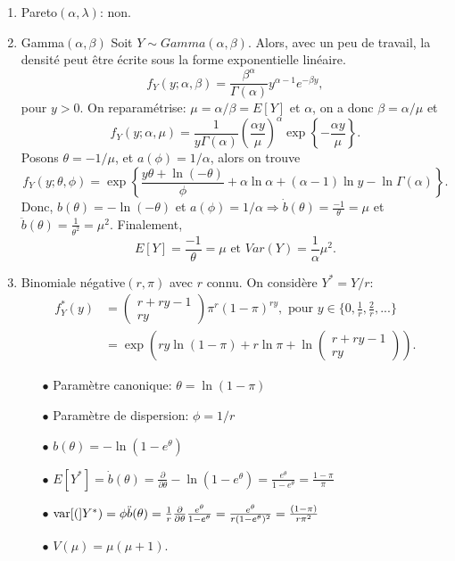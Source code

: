 \begin{solution}{5.1}
\begin{enumerate}
\item Pareto$(\alpha,\lambda)$: non.
\item Gamma$(\alpha,\beta)$
Soit $Y\sim Gamma(\alpha,\beta)$. Alors, avec un peu de travail, la densité peut être écrite sous la forme exponentielle linéaire.
$$f_{Y}(y;\alpha,\beta)=\frac{\beta^{\alpha}}{\Gamma(\alpha)}y^{\alpha-1}e^{-\beta y},$$ pour $y>0$. On reparamétrise: $\mu=\alpha/\beta=E[Y]$ et $\alpha$, on a donc $\beta=\alpha/\mu$ et $$f_{Y}(y;\alpha,\mu)=\frac{1}{y\Gamma(\alpha)}\left(\frac{\alpha y}{\mu}\right)^{\alpha}\exp\left\{-\frac{\alpha y}{\mu}\right\}.$$ Posons $\theta=-1/\mu$, et $a(\phi)=1/\alpha$, alors on trouve $$f_{Y}(y;\theta,\phi)=\exp\left\{\frac{y\theta +\ln(-\theta)}{\phi} +\alpha\ln\alpha+(\alpha-1)\ln y -\ln\Gamma(\alpha)\right\}.$$ Donc, $b(\theta)=-\ln(-\theta)$ et $a(\phi)=1/\alpha \Rightarrow \dot{b}(\theta)=\frac{-1}{\theta}=\mu$ et $\ddot{b}(\theta)=\frac{1}{\theta^{2}}=\mu^{2}$. Finalement, $$E[Y]=\frac{-1}{\theta}=\mu \mbox{ et } Var(Y)=\frac{1}{\alpha}\mu^{2}.$$

\item Binomiale négative$(r,\pi)$ avec $r$ connu. On considère $Y^*=Y/r$:
\begin{align*}
f_Y^*(y)&=\begin{pmatrix} r+ry-1\\ry\end{pmatrix}\pi^r(1-\pi)^{ry}, \mbox{ pour } y\in \{0,\frac{1}{r},\frac{2}{r},...\}\\
&=\exp\left(ry\ln(1-\pi)+r\ln\pi+\ln\begin{pmatrix} r+ry-1\\ry\end{pmatrix}\right).
\end{align*}
\begin{itemize}
\item[$\bullet$] Paramètre canonique: $\theta=\ln(1-\pi)$
\item[$\bullet$] Paramètre de dispersion:  $\phi=1/r$
\item[$\bullet$] $b(\theta)=-\ln(1-e^\theta)$
\item[$\bullet$] $E[Y^*]=\dot{b}(\theta)=\frac{\partial}{\partial\theta}-\ln(1-e^\theta)=\frac{e^{\theta}}{1-e^\theta}=\frac{1-\pi}{\pi}$
\item[$\bullet$] $\mathrm{var} [ ( ]Y^*)=\phi\ddot{b}(\theta)=\frac{1}{r}\frac{\partial}{\partial\theta}\frac{e^{\theta}}{1-e^\theta}=\frac{e^\theta}{r(1-e^\theta)^2}=\frac{(1-\pi)}{r\pi^2}$
\item[$\bullet$] $V(\mu)=\mu(\mu+1)$.
\end{itemize}
\end{enumerate}
\end{solution}

